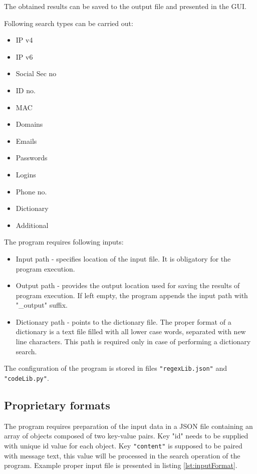 \documentclass[a4paper,twoside,12pt]{book}
\begin{document}
The obtained results can be saved to the output file and presented in the GUI.

Following search types can be carried out:

\begin{itemize}
   \item IP v4
   \item IP v6
   \item Social Sec no
   \item ID no.
   \item MAC
   \item Domains
   \item Emails
   \item Passwords
   \item Logins
   \item Phone no.
   \item Dictionary
   \item Additional
\end{itemize}

The program requires following inputs:

\begin{itemize}
   \item Input path - specifies location of the input file. It is obligatory for the program execution.
   \item Output path - provides the output location used for saving the results of program execution. 
   If left empty, the program appends the input path with "\_output" suffix. 
   \item Dictionary path - points to the dictionary file. The proper format of a dictionary
   is a text file filled with all lower case words, separated with new line characters. This path is required
   only in case of performing a dictionary search.
\end{itemize}

The configuration of the program is stored in files \lstinline|"regexLib.json"| and \lstinline|"codeLib.py"|.

\subsection{Proprietary formats}

The program requires preparation of the input data in a JSON file containing
an array of objects composed of two key-value pairs. Key "id" needs to be 
supplied with unique id value for each object. Key \lstinline|"content"| is supposed to be 
paired with message text, this value will be processed in the search operation 
of the program. Example proper input file is presented in listing \ref{lst:inputFormat}.
\end{document}

